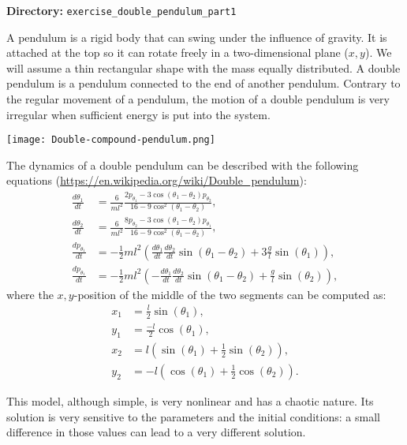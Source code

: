 {\bf Directory:} \lstinline{exercise_double_pendulum_part1}

A pendulum is a rigid body that can swing under the influence of gravity. It is attached at the top so it can rotate freely in a two-dimensional plane ($x,y$).
We will assume a thin rectangular shape with the mass equally distributed. A double pendulum is a pendulum connected to the end of another pendulum. Contrary to the 
regular movement of a pendulum, the motion of a double pendulum is very irregular when sufficient energy is put into the system. 

\begin{center}
    \texttt{[image: Double-compound-pendulum.png]}
\end{center}

The dynamics of a double pendulum can be described with the following equations (\url{https://en.wikipedia.org/wiki/Double_pendulum}):
\begin{align}
   \frac{d \theta_1}{dt}&= \frac{6}{m l^2} \frac{2 p_{\theta_1} - 3\cos(\theta_1-\theta_2) p_{\theta_2}}
   {16-9 \cos^2(\theta_1-\theta_2)},\\
   \frac{d \theta_2}{dt}&= \frac{6}{m l^2} \frac{8 p_{\theta_2} - 3\cos(\theta_1-\theta_2) p_{\theta_1}}
   {16-9 \cos^2(\theta_1-\theta_2)},\\
   \frac{dp_{\theta_1}}{dt} &= -\frac{1}{2} ml^2 \left( \frac{d \theta_1}{dt} \frac{d \theta_2}{dt} \sin(\theta_1-\theta_2) + 3\frac{g}{l} \sin(\theta_1) \right),  \\
   \frac{dp_{\theta_1}}{dt} &= -\frac{1}{2} ml^2 \left( -\frac{d \theta_1}{dt} \frac{d \theta_2}{dt} \sin(\theta_1-\theta_2) + \frac{g}{l} \sin(\theta_2) \right), 
\end{align}
where the $x,y$-position of the middle of the two segments can be computed as:
\begin{align}
   x_1 &= \frac{l}{2} \sin(\theta_1), \\
   y_1 &= \frac{-l}{2} \cos(\theta_1), \\
   x_2 &= l ( \sin(\theta_1) + \frac{1}{2} \sin(\theta_2) ), \\
   y_2 &= -l ( \cos(\theta_1) + \frac{1}{2} \cos(\theta_2) ).
\end{align}

This model, although simple, is very nonlinear and has a chaotic nature.  Its
solution is very sensitive to the parameters and the initial conditions: a
small difference in those values can lead to a very different solution.

